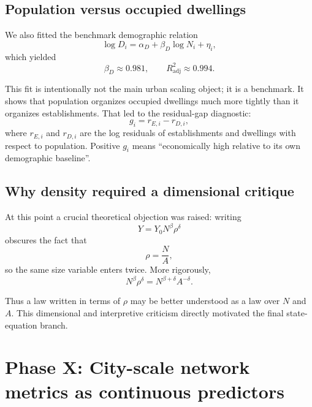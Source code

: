 \documentclass[11pt]{article}
\newcommand{\adjR}{R^2_{\mathrm{adj}}}
\begin{document}
\subsection{Population versus occupied dwellings}

We also fitted the benchmark demographic relation
\begin{equation}
\log D_i = \alpha_D + \beta_D \log N_i + \eta_i,
\end{equation}
which yielded
\begin{equation}
\beta_D \approx 0.981,
\qquad
\adjR \approx 0.994.
\end{equation}

This fit is intentionally not the main urban scaling object; it is a benchmark. It shows that population organizes occupied dwellings much more tightly than it organizes establishments. That led to the residual-gap diagnostic:
\begin{equation}
g_i = r_{E,i} - r_{D,i},
\end{equation}
where \(r_{E,i}\) and \(r_{D,i}\) are the log residuals of establishments and dwellings with respect to population. Positive \(g_i\) means ``economically high relative to its own demographic baseline''.

\subsection{Why density required a dimensional critique}

At this point a crucial theoretical objection was raised: writing
\begin{equation}
Y = Y_0 N^\beta \rho^\delta
\end{equation}
obscures the fact that
\begin{equation}
\rho = \frac{N}{A},
\end{equation}
so the same size variable enters twice. More rigorously,
\begin{equation}
N^\beta \rho^\delta = N^{\beta+\delta} A^{-\delta}.
\end{equation}

Thus a law written in terms of \(\rho\) may be better understood as a law over \(N\) and \(A\). This dimensional and interpretive criticism directly motivated the final state-equation branch.

\section{Phase X: City-scale network metrics as continuous predictors}
\end{document}
